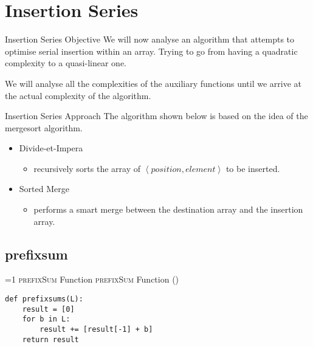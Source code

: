\section{Insertion Series}
    \begin{frame}{Insertion Series Objective}
        We will now analyse an algorithm that attempts to optimise serial insertion within an array. Trying to go from having a quadratic complexity to a quasi-linear one.

        \leavevmode

        We will analyse all the complexities of the auxiliary functions until we arrive at the actual complexity of the algorithm.
    \end{frame}

    \begin{frame}{Insertion Series Approach}
        The algorithm shown below is based on the idea of the mergesort algorithm.

        \begin{itemize}
            \item Divide-et-Impera
            \begin{itemize}
                \item recursively sorts the array of $\left<position, element\right>$ to be inserted.
            \end{itemize}

            \item Sorted Merge
            \begin{itemize}
                \item performs a smart merge between the destination array and the insertion array.
            \end{itemize}
        \end{itemize}
    \end{frame}

    \subsection{prefixsum}
\setcounter{prefixsumfunctioncounter}{1}
\newcommand{\prefixsumfunctionframe}{%
    \ifnum\value{prefixsumfunctioncounter}=1
        \textsc{prefixSum} Function%
    \else
        \textsc{prefixSum} Function (\theprefixsumfunctioncounter)%
    \fi
}
        \begin{frame}[containsverbatim]{\prefixsumfunctionframe}
            \begin{verbatim}
def prefixsums(L):
    result = [0]
    for b in L:
        result += [result[-1] + b]
    return result
                \end{verbatim}
        \end{frame}


